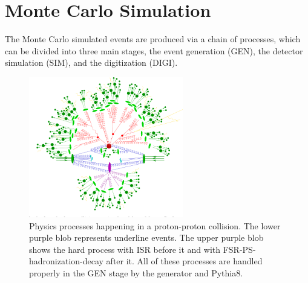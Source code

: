 
\section{Monte Carlo Simulation}
\label{sec:cmsexperiment:simulation}



The Monte Carlo simulated events are produced via a chain of processes, which can be divided into three main stages, the event generation (GEN), the detector simulation (SIM), and the digitization (DIGI). 


\begin{figure}[ht]
    \centering
    \includegraphics[trim={0 0.1cm 0 0}, clip, width=0.6\textwidth]{chapters/CMSExperiment/sectionMCSimulation/figures/ps.png}
    \caption{Physics processes happening in a proton-proton collision. The lower purple blob represents underline events. The upper purple blob shows the hard process with ISR before it and with FSR-PS-hadronization-decay after it. All of these processes are handled properly in the GEN stage by the generator and Pythia8. }
    \label{fig:cmsexperiment:simulation:collision}
\end{figure}

